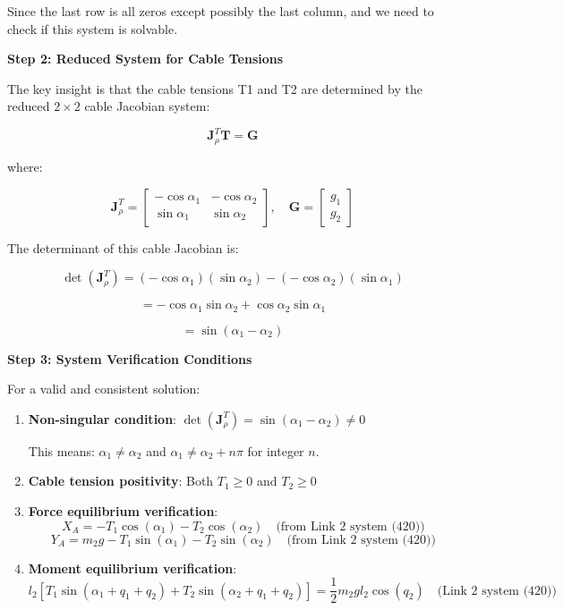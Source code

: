 Since the last row is all zeros except possibly the last column, and we need to check if this system is solvable.

\textbf{Step 2: Reduced System for Cable Tensions}

The key insight is that the cable tensions T1 and T2 are determined by the reduced $2 \times 2$ cable Jacobian system:

$$\mathbf{J}_{\rho}^T \mathbf{T} = \mathbf{G}$$

where:

$$\mathbf{J}_{\rho}^T = \begin{bmatrix} 
-\cos\alpha_1 & -\cos\alpha_2 \\
\sin\alpha_1 & \sin\alpha_2 
\end{bmatrix}, \quad 
\mathbf{G} = \begin{bmatrix} g_1 \\ g_2 \end{bmatrix}$$

The determinant of this cable Jacobian is:

$$\det(\mathbf{J}_{\rho}^T) = (-\cos\alpha_1)(\sin\alpha_2) - (-\cos\alpha_2)(\sin\alpha_1)$$

$$= -\cos\alpha_1 \sin\alpha_2 + \cos\alpha_2 \sin\alpha_1$$

$$= \sin(\alpha_1 - \alpha_2)$$

\textbf{Step 3: System Verification Conditions}

For a valid and consistent solution:

\begin{enumerate}
    \item \textbf{Non-singular condition}: $\det(\mathbf{J}_{\rho}^T) = \sin(\alpha_1 - \alpha_2) \neq 0$
    
    This means: $\alpha_1 \neq \alpha_2$ and $\alpha_1 \neq \alpha_2 + n\pi$ for integer $n$.
    
    \item \textbf{Cable tension positivity}: Both $T_1 \geq 0$ and $T_2 \geq 0$
    
    \item \textbf{Force equilibrium verification}:
    $$X_A = -T_1 \cos(\alpha_1) - T_2 \cos(\alpha_2) \quad \text{(from Link 2 system (420))}$$
    $$Y_A = m_2 g - T_1 \sin(\alpha_1) - T_2 \sin(\alpha_2) \quad \text{(from Link 2 system (420))}$$
    
    \item \textbf{Moment equilibrium verification}:
    $$l_2[T_1 \sin(\alpha_1 + q_1 + q_2) + T_2 \sin(\alpha_2 + q_1 + q_2)] = \frac{1}{2} m_2 g l_2 \cos(q_2) \quad \text{(Link 2 system (420))}$$
\end{enumerate}

